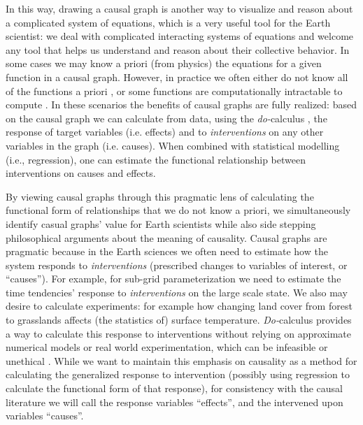 \documentclass[12pt]{article}
\begin{document}
In this way, drawing a causal graph is another way to visualize and
reason about a complicated system of equations, which is a very useful
tool for the Earth scientist: we deal with complicated interacting
systems of equations and welcome any tool that helps us understand and
reason about their collective behavior. In some cases we may know a
priori (from physics) the equations for a given function in a causal
graph. However, in practice we often either do not know all of the
functions a priori \citep[e.g., plant stomata response to
VPD;][]{massmann2019, zhou2019arid, zhou2019feedback, grossiord2020},
or some functions are computationally intractable to compute
\citep[e.g., turbulence, moist convection, and cloud microphysics in
large scale models;][]{zadra2018}. In these scenarios the benefits of
causal graphs are fully realized: based on the causal graph we can
calculate from data, using the \textit{do-}calculus
\citep{pearl-1994-do-calculus}, the response of target variables
(i.e. effects) and to \textit{interventions} on any other variables in
the graph (i.e. causes). When combined with statistical modelling
(i.e., regression), one can estimate the functional relationship
between interventions on causes and effects.

By viewing causal graphs through this pragmatic lens of calculating
the functional form of relationships that we do not know a priori, we
simultaneously identify casual graphs' value for Earth scientists
while also side stepping philosophical arguments about the meaning of
causality. Causal graphs are pragmatic because in the Earth sciences
we often need to estimate how the system responds to
\emph{interventions} (prescribed changes to variables of interest, or
``causes''). For example, for sub-grid parameterization we need to
estimate the time tendencies' response to \emph{interventions} on the
large scale state. We also may desire to calculate experiments: for
example how changing land cover from forest to grasslands affects (the
statistics of) surface temperature. \textit{Do-}calculus provides a
way to calculate this response to interventions without relying on
approximate numerical models or real world experimentation, which can
be infeasible or unethical \citep[as is the case for geoengineering;
e.g., unilateral decisions to seed the oceans with iron, or spray
aerosols in the atmosphere,][]{hamilton2013no}. While we want to
maintain this emphasis on causality as a method for calculating the
generalized response to intervention (possibly using regression to
calculate the functional form of that response), for consistency with
the causal literature we will call the response variables ``effects'',
and the intervened upon variables ``causes''.
\end{document}
